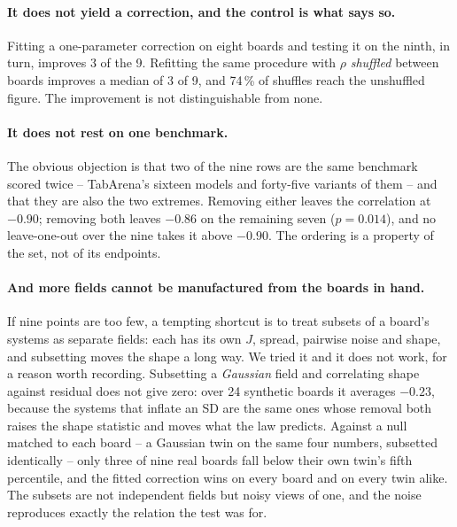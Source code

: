 \documentclass[10pt]{article}
\begin{document}
\paragraph{It does not yield a correction, and the control is what says so.}
Fitting a one-parameter correction on eight boards and testing it on the
ninth, in turn, improves 3 of the 9. Refitting the same procedure with
$\rho$ \emph{shuffled} between boards improves a median of 3 of 9, and 74\,\% of
shuffles reach the unshuffled figure. The improvement is not distinguishable
from none.

\paragraph{It does not rest on one benchmark.} The obvious objection is that
two of the nine rows are the same benchmark scored twice -- TabArena's
sixteen models and forty-five variants of them -- and that they are also the
two extremes. Removing either leaves the correlation at $-0.90$; removing
both leaves $-0.86$ on the remaining seven ($p = 0.014$), and no
leave-one-out over the nine takes it above $-0.90$. The ordering is a
property of the set, not of its endpoints.

\paragraph{And more fields cannot be manufactured from the boards in hand.}
If nine points are too few, a tempting shortcut is to treat subsets of a
board's systems as separate fields: each has its own $J$, spread, pairwise
noise and shape, and subsetting moves the shape a long way. We tried it and
it does not work, for a reason worth recording. Subsetting a \emph{Gaussian}
field and correlating shape against residual does not give zero: over 24
synthetic boards it averages $-0.23$, because the systems that inflate an SD
are the same ones whose removal both raises the shape statistic and moves
what the law predicts. Against a null matched to each board -- a Gaussian
twin on the same four numbers, subsetted identically -- only three of nine
real boards fall below their own twin's fifth percentile, and the fitted
correction wins on every board and on every twin alike. The subsets are not
independent fields but noisy views of one, and the noise reproduces exactly
the relation the test was for.
\end{document}
